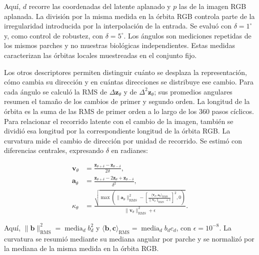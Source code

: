 Aquí, \(d\) recorre las coordenadas del latente aplanado y \(p\) las de la
imagen RGB aplanada. La división por la misma medida en la órbita RGB controla parte de la
irregularidad introducida por la interpolación de la entrada. Se evaluó con
\(\delta=1^\circ\) y, como control de robustez, con
\(\delta=5^\circ\). Los ángulos son mediciones repetidas de los mismos parches
y no muestras biológicas independientes. Estas medidas caracterizan las órbitas locales muestreadas en el
conjunto fijo.

Los otros descriptores permiten distinguir cuánto se desplaza la representación,
cómo cambia su dirección y en cuántas direcciones se distribuye ese cambio.
Para cada ángulo se calculó la RMS de \(\Delta\mathbf z_\theta\) y de
\(\Delta^2\mathbf z_\theta\); sus promedios angulares resumen el tamaño de
los cambios de primer y segundo orden. La longitud de la órbita es la suma de
las RMS de primer orden a lo largo de los 360 pasos cíclicos. Para relacionar
el recorrido latente con el cambio de la imagen, también se dividió esa
longitud por la correspondiente longitud de la órbita RGB. La curvatura mide
el cambio de dirección por unidad de recorrido. Se estimó con diferencias
centrales, expresando \(\delta\) en radianes:

\begin{equation}
\begin{aligned}
    \mathbf v_\theta
      &=\frac{\mathbf z_{\theta+\delta}-\mathbf z_{\theta-\delta}}{2\delta},\\
    \mathbf a_\theta
      &=\frac{\mathbf z_{\theta+\delta}-2\mathbf z_\theta
              +\mathbf z_{\theta-\delta}}{\delta^2},\\
    \kappa_\theta
      &=\frac{\sqrt{\max\!\left(\lVert\mathbf a_\theta\rVert_{\mathrm{RMS}}^2
          -\left[\frac{\langle\mathbf v_\theta,\mathbf a_\theta\rangle_{\mathrm{RMS}}}
            {\lVert\mathbf v_\theta\rVert_{\mathrm{RMS}}+\epsilon}\right]^2,0\right)}}
        {\lVert\mathbf v_\theta\rVert_{\mathrm{RMS}}^2+\epsilon}.
\end{aligned}
\label{eq:curvatura-orbita}
\end{equation}

Aquí, \(\lVert\mathbf b\rVert_{\mathrm{RMS}}^2=\operatorname{media}_d b_d^2\)
y \(\langle\mathbf b,\mathbf c\rangle_{\mathrm{RMS}}=
\operatorname{media}_d b_dc_d\), con \(\epsilon=10^{-8}\). La curvatura se
resumió mediante su mediana angular por parche y se normalizó por la mediana
de la misma medida en la órbita RGB.

